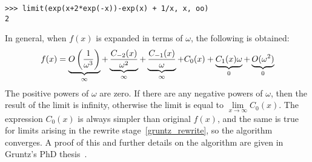 \begin{verbatim}
>>> limit(exp(x+2*exp(-x))-exp(x) + 1/x, x, oo)
2
\end{verbatim}

In general, when $f(x)$ is expanded in terms of $\omega$, the following is obtained:
\begin{equation}
f(x) = \underbrace{O\left({1\over \omega^3}\right)}_\infty
    + \underbrace{C_{-2}(x)\over \omega^2}_\infty
    + \underbrace{C_{-1}(x)\over \omega}_\infty
    + {C_{0}(x)}
    + \underbrace{C_{1}(x)\omega}_0
    + \underbrace{O(\omega^2)}_0
\end{equation}
The positive powers of $\omega$ are zero. If there are any negative powers of
$\omega$, then the result of the limit is infinity, otherwise the limit is
equal to $\lim\limits_{x\to\infty} C_0(x)$. The expression $C_0(x)$ is always
simpler than original $f(x)$, and the same is true for limits arising in the
rewrite stage~\eqref{gruntz_rewrite}, so the algorithm converges. A proof of this and further
details on the algorithm are given in Gruntz's PhD thesis~\cite{Gruntz1996limits}.
